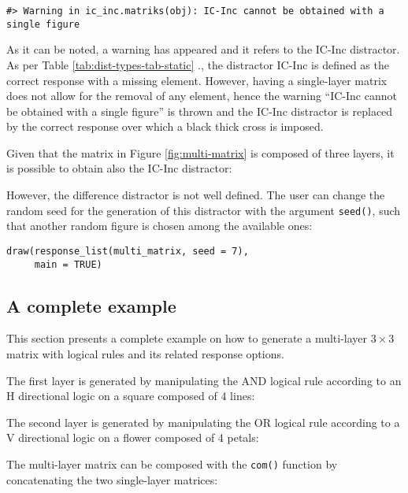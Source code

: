 \begin{verbatim}
#> Warning in ic_inc.matriks(obj): IC-Inc cannot be obtained with a single figure
\end{verbatim}



As it can be noted, a warning has appeared and it refers to the IC-Inc distractor.
As per Table \ref{tab:dist-types-tab-static} ., the distractor IC-Inc is defined as the correct response with a missing element.
However, having a single-layer matrix does not allow for the removal of any element, hence the warning ``IC-Inc cannot be obtained with a single figure'' is thrown and the IC-Inc distractor is replaced by the correct response over which a black thick cross is imposed.

Given that the matrix in Figure \ref{fig:multi-matrix} is composed of three layers, it is possible to obtain also the IC-Inc distractor:



However, the difference distractor is not well defined.
The user can change the random seed for the generation of this distractor with the argument \texttt{seed()}, such that another random figure is chosen among the available ones:

\begin{verbatim}
draw(response_list(multi_matrix, seed = 7), 
     main = TRUE)
\end{verbatim}



\subsection{A complete example}\label{a-complete-example}

This section presents a complete example on how to generate a multi-layer \(3 \times 3\) matrix with logical rules and its related response options.

The first layer is generated by manipulating the AND logical rule according to an H directional logic on a square composed of 4 lines:



The second layer is generated by manipulating the OR logical rule according to a V directional logic on a flower composed of 4 petals:



The multi-layer matrix can be composed with the \texttt{com()} function by concatenating the two single-layer matrices:



